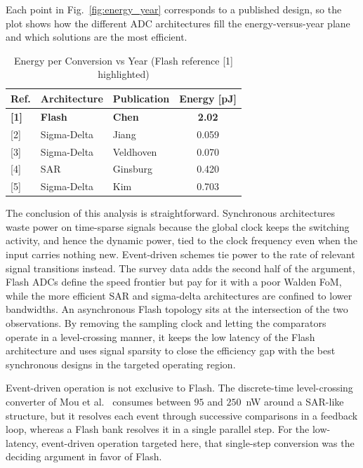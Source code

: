 \par\vspace{1.5em}
\par\vspace{1.5em}
\par\vspace{1.5em}
Each point in Fig.~\ref{fig:energy_year} corresponds to a published design, so the plot shows how the different ADC architectures fill the energy-versus-year plane and which solutions are the most efficient.
\begin{table}[htbp]
\centering
\caption{Energy per Conversion vs Year (Flash reference [1] highlighted)}
\label{tab:energy_year}
\begin{tabular}{lllc}
\toprule
\textbf{Ref.} & \textbf{Architecture} & \textbf{Publication} & \textbf{Energy [pJ]} \\ \midrule
\textbf{[1]}  & \textbf{Flash}       & \textbf{Chen \cite{Chen_2006}} & \textbf{2.02} \\
{} [2]        & Sigma-Delta          & Jiang \cite{Jiang_2018}        & 0.059 \\
{} [3]        & Sigma-Delta          & Veldhoven \cite{Veldhoven_2021}& 0.070 \\
{} [4]        & SAR                  & Ginsburg \cite{Ginsburg_2014}  & 0.420 \\
{} [5]        & Sigma-Delta          & Kim \cite{Kim_2018}            & 0.703 \\ \bottomrule
\end{tabular}
\end{table}
The conclusion of this analysis is straightforward. Synchronous architectures waste power on time-sparse signals because the global clock keeps the switching activity, and hence the dynamic power, tied to the clock frequency even when the input carries nothing new. Event-driven schemes tie power to the rate of relevant signal transitions instead. The survey data adds the second half of the argument, Flash ADCs define the speed frontier but pay for it with a poor Walden FoM, while the more efficient SAR and sigma-delta architectures are confined to lower bandwidths. An asynchronous Flash topology sits at the intersection of the two observations. By removing the sampling clock and letting the comparators operate in a level-crossing manner, it keeps the low latency of the Flash architecture and uses signal sparsity to close the efficiency gap with the best synchronous designs in the targeted operating region.

Event-driven operation is not exclusive to Flash. The discrete-time level-crossing converter of Mou et al.\ \cite{mou2026} consumes between $95$ and $250$~nW around a SAR-like structure, but it resolves each event through successive comparisons in a feedback loop, whereas a Flash bank resolves it in a single parallel step. For the low-latency, event-driven operation targeted here, that single-step conversion was the deciding argument in favor of Flash.












